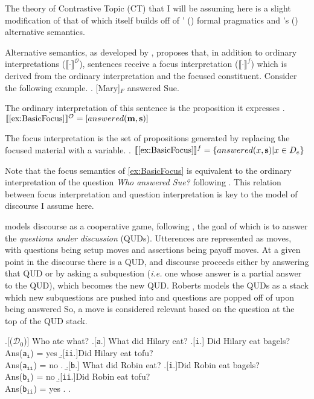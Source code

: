 \documentclass[GPFinal]{subfiles}
\begin{document}
The theory of Contrastive Topic (CT) that I will be assuming here is a slight modification of that of \textcite{buring2003d,buringforthcomingtopic} which itself builds off of \citeauthor{roberts2012information}' (\citeyear{roberts2012information}) formal pragmatics and \citeauthor{rooth1992theory}'s (\citeyear{rooth1992theory}) alternative semantics.

Alternative semantics, as developed by \textcite{rooth1992theory}, proposes that, in addition to ordinary interpretations ($\llbracket\cdot\rrbracket^\mathcal{O}$), sentences receive a focus interpretation ($\llbracket\cdot\rrbracket^f$) which is derived from the ordinary interpretation and the focused constituent.
Consider the following example.
\ex.\label{ex:BasicFocus} [Mary]$_F$ answered Sue.

The ordinary interpretation of this sentence is the proposition it expresses
\ex.\label{ex:OrdinaryInterpretation} $\llbracket\ref{ex:BasicFocus}\rrbracket^\mathcal{O} = [answered(\mathbf{m}, \mathbf{s})]$

The focus interpretation is the set of propositions generated by replacing the focused material with a variable.
\ex.\label{ex:FocusInterpretation} $\llbracket\ref{ex:BasicFocus}\rrbracket^f = \left\{ answered(x, \mathbf{s}) | x \in D_e \right\}$

Note that the focus semantics of \ref{ex:BasicFocus} is equivalent to the ordinary interpretation of the question \textit{Who answered Sue?} following \textcite{hamblin1973questions}. 
This relation between focus interpretation and question interpretation is key to the model of discourse I assume here.

\textcite{roberts2012information} models discourse as a cooperative game, following \textcite{lewis1979scorekeeping}, the goal of which is to answer the \textit{questions under discussion} (QUDs).
Utterences are represented as moves, with questions being setup moves and assertions being payoff moves.
At a given point in the discourse there is a QUD, and discourse proceeds either by answering that QUD or by asking a subquestion (\textit{i.e.} one whose answer is a partial answer to the QUD), which becomes the new QUD.
Roberts models the QUDs as a stack which new subquestions are pushed into and questions are popped off of upon being answered
So, a move is considered relevant based on the question at the top of the QUD stack.

\ex.[($\mathcal{D}_0$)] Who ate what?
	\a.[\texttt{a}.] What did Hilary eat?
		\a.[\texttt{i}.] Did Hilary eat bagels?\\
		Ans(\texttt{a}$_\texttt{i}$) = yes
		\b.[\texttt{ii}.]Did Hilary eat tofu?\\
		Ans(\texttt{a}$_\texttt{ii}$) = no
		\z.
	\b.[\texttt{b}.] What did Robin eat?
		\a.[\texttt{i}.]Did Robin eat bagels?\\
		Ans(\texttt{b}$_\texttt{i}$) = no
		\b.[\texttt{ii}.]Did Robin eat tofu?\\
		Ans(\texttt{b}$_\texttt{ii}$) = yes
		\z.
	\z.
\end{document}
